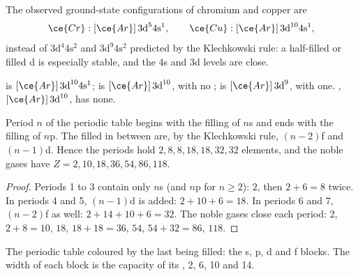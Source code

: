 \begin{proposition}\label{prop:b1:quantum-numbers:exceptions}
The observed ground-state configurations of chromium and copper are
\[
  \ce{Cr}: [\ce{Ar}]\,3\text{d}^5 4\text{s}^1, \qquad
  \ce{Cu}: [\ce{Ar}]\,3\text{d}^{10} 4\text{s}^1 ,
\]
instead of $3\text{d}^4 4\text{s}^2$ and $3\text{d}^9 4\text{s}^2$
predicted by the Klechkowski rule: a half-filled or filled d  is
especially stable, and the 4s and 3d levels are close.
\end{proposition}

\begin{example}\label{ex:b1:quantum-numbers:copper}
 is $[\ce{Ar}]\,3\text{d}^{10} 4\text{s}^1$;  is
$[\ce{Ar}]\,3\text{d}^{10}$, with no ;  is
$[\ce{Ar}]\,3\text{d}^9$, with one. , $[\ce{Ar}]\,3\text{d}^{10}$,
has none.
\end{example}

\begin{proposition}\label{prop:b1:quantum-numbers:table}
Period $n$ of the periodic table begins with the filling of $n$s and ends
with the filling of $n$p. The  filled in between are, by the
Klechkowski rule, $(n-2)$f and $(n-1)$d. Hence the periods hold
$2, 8, 8, 18, 18, 32, 32$ elements, and the noble gases have $Z = 2, 10,
18, 36, 54, 86, 118$.
\end{proposition}

\begin{proof}
Periods 1 to 3 contain only $n$s (and $n$p for $n \ge 2$): $2$, then
$2 + 6 = 8$ twice. In periods 4 and 5, $(n-1)$d is added: $2 + 10 + 6 =
18$. In periods 6 and 7, $(n-2)$f as well: $2 + 14 + 10 + 6 = 32$. The
noble gases close each period: $2$, $2 + 8 = 10$, $18$, $18 + 18 = 36$,
$54$, $54 + 32 = 86$, $118$.
\end{proof}

\begin{omfigure}
\omperiodictable[colour=blocks, legend]

{\small The periodic table coloured by the last  being filled:
the s, p, d and f blocks. The width of each block is the capacity of its
, 2, 6, 10 and 14.}
\end{omfigure}

